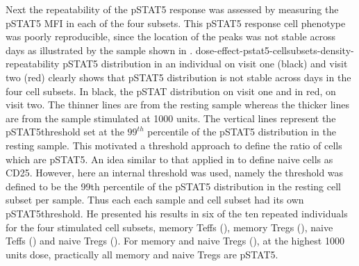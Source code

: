 Next the repeatability of the pSTAT5 response was assessed by measuring the pSTAT5 \gls{MFI} in each of the four subsets.
This pSTAT5 response cell phenotype was poorly reproducible, since the location of the peaks was not stable across days as illustrated by the sample shown in .
{dose-effect-pstat5-cellsubsets-density-repeatability}
{ pSTAT5 distribution in an individual on visit one (black) and visit two (red) clearly shows that pSTAT5 distribution is not stable across days in the four cell
subsets. }
{
In black, the pSTAT distribution on visit one and in red, on visit two.
The thinner lines are from the resting sample whereas the thicker lines are from the sample stimulated at 1000 units.
The vertical lines represent the pSTAT5\positive threshold set at the $99^{th}$ percentile of the pSTAT5 distribution in the resting sample.
}
This motivated a threshold approach to define the ratio of cells which are pSTAT5\positive.
An idea similar to that applied in  to define naive cells as CD25\positive.
However, here an internal threshold was used, namely
the threshold was defined to be the 99th percentile of the pSTAT5 distribution in the resting cell subset per sample.
Thus each each sample and cell subset had its own pSTAT5\positive threshold.
He presented his results in six of the ten repeated individuals for the four stimulated cell subsets,
memory Teffs (),
memory Tregs (),
naive Teffs ()
and naive Tregs ().
For memory and naive Tregs (), at the highest 1000 units dose,
practically all memory and naive Tregs are pSTAT5\positive.
